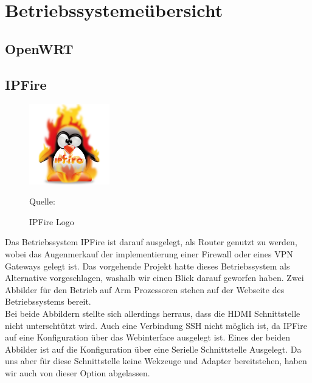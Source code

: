 \chapter{Betriebssysteme\"ubersicht}

\section{OpenWRT}

\section{IPFire}
\begin{figure}
\centering
\includegraphics[width=3.5cm]{pictures/Jakob/IPFire}
\caption{IPFire Logo}
Quelle: \cite{fire1}
\end{figure}
Das Betriebssystem IPFire ist darauf ausgelegt, als Router genutzt zu werden, wobei das Augenmerkauf der implementierung einer Firewall oder eines VPN Gateways gelegt ist.
Das vorgehende Projekt hatte dieses Betriebssystem als Alternative vorgeschlagen, washalb wir einen Blick darauf geworfen haben. Zwei Abbilder für den Betrieb auf Arm Prozessoren stehen auf der Webseite des Betriebssystems bereit. \cite{fire} \\
Bei beide Abbildern stellte sich allerdings herraus, dass die HDMI Schnittstelle nicht unterschtützt wird.
Auch eine Verbindung SSH nicht möglich ist, da IPFire auf eine Konfiguration über das Webinterface ausgelegt ist.
Eines der beiden Abbilder ist auf die Konfiguration über eine Serielle Schnittstelle Ausgelegt. Da uns aber für diese Schnittstelle keine Wekzeuge und Adapter bereitstehen, haben wir auch von dieser Option abgelassen.\\

